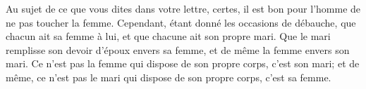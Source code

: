 Au sujet de ce que vous dites dans votre lettre,
	certes, il est bon pour l’homme de ne pas toucher la femme.
Cependant, étant donné les occasions de débauche,
	que chacun ait sa femme à lui, et que chacune ait son propre mari.
Que le mari remplisse son devoir d’époux envers sa femme,
	et de même la femme envers son mari.
Ce n’est pas la femme qui dispose de son propre corps, c’est son mari;
	et de même,
		ce n’est pas le mari qui dispose de son propre corps, c’est sa femme.
